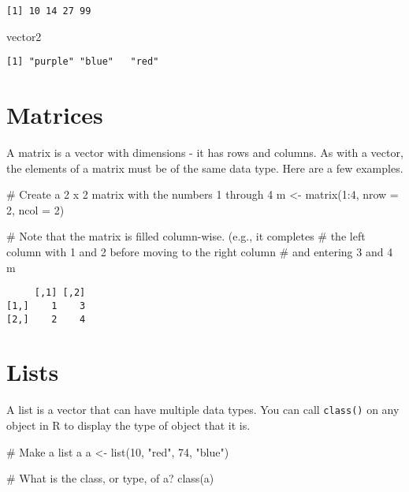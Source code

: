 \documentclass[
  letterpaper,
  DIV=11,
  numbers=noendperiod]{scrreprt}
\newenvironment{Shaded}{\begin{snugshade}}{\end{snugshade}}
\newcommand{\AttributeTok}[1]{\textcolor[rgb]{0.40,0.45,0.13}{#1}}
\newcommand{\CommentTok}[1]{\textcolor[rgb]{0.37,0.37,0.37}{#1}}
\newcommand{\DecValTok}[1]{\textcolor[rgb]{0.68,0.00,0.00}{#1}}
\newcommand{\FunctionTok}[1]{\textcolor[rgb]{0.28,0.35,0.67}{#1}}
\newcommand{\NormalTok}[1]{\textcolor[rgb]{0.00,0.23,0.31}{#1}}
\newcommand{\OtherTok}[1]{\textcolor[rgb]{0.00,0.23,0.31}{#1}}
\newcommand{\SpecialCharTok}[1]{\textcolor[rgb]{0.37,0.37,0.37}{#1}}
\newcommand{\StringTok}[1]{\textcolor[rgb]{0.13,0.47,0.30}{#1}}
\begin{document}
\begin{verbatim}
[1] 10 14 27 99
\end{verbatim}

\begin{Shaded}
\begin{Highlighting}[]
\NormalTok{vector2}
\end{Highlighting}
\end{Shaded}

\begin{verbatim}
[1] "purple" "blue"   "red"   
\end{verbatim}

\section{Matrices}\label{matrices}

A matrix is a vector with dimensions - it has rows and columns. As with
a vector, the elements of a matrix must be of the same data type. Here
are a few examples.

\begin{Shaded}
\begin{Highlighting}[]
\CommentTok{\# Create a 2 x 2 matrix with the numbers 1 through 4}
\NormalTok{m }\OtherTok{\textless{}{-}} \FunctionTok{matrix}\NormalTok{(}\DecValTok{1}\SpecialCharTok{:}\DecValTok{4}\NormalTok{, }\AttributeTok{nrow =} \DecValTok{2}\NormalTok{, }\AttributeTok{ncol =} \DecValTok{2}\NormalTok{) }

\CommentTok{\# Note that the matrix is filled column{-}wise. (e.g., it completes \# the left column with 1 and 2 before moving to the right column }
\CommentTok{\# and entering 3 and 4 }
\NormalTok{m}
\end{Highlighting}
\end{Shaded}

\begin{verbatim}
     [,1] [,2]
[1,]    1    3
[2,]    2    4
\end{verbatim}

\section{Lists}\label{lists}

A list is a vector that can have multiple data types. You can call
\texttt{class()} on any object in R to display the type of object that
it is.

\begin{Shaded}
\begin{Highlighting}[]
\CommentTok{\# Make a list a}
\NormalTok{a }\OtherTok{\textless{}{-}} \FunctionTok{list}\NormalTok{(}\DecValTok{10}\NormalTok{, }\StringTok{"red"}\NormalTok{, }\DecValTok{74}\NormalTok{, }\StringTok{"blue"}\NormalTok{)}

\CommentTok{\# What is the class, or type, of a?}
\FunctionTok{class}\NormalTok{(a)}
\end{Highlighting}
\end{Shaded}
\end{document}
